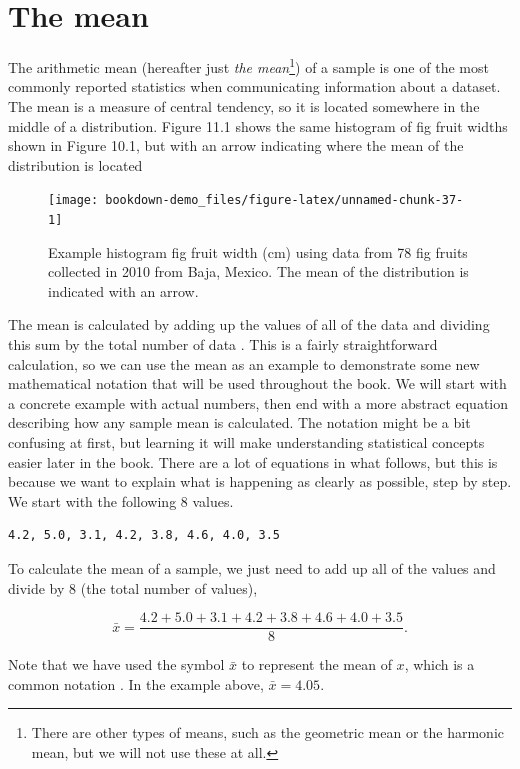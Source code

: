 \documentclass[
  openany]{scrbook}
\begin{document}
\hypertarget{the-mean}{%
\section{The mean}\label{the-mean}}

The arithmetic mean (hereafter just \emph{the mean}\footnote{There are other types of means, such as the geometric mean or the harmonic mean, but we will not use these at all.}) of a sample is one of the most commonly reported statistics when communicating information about a dataset.
The mean is a measure of central tendency, so it is located somewhere in the middle of a distribution.
Figure 11.1 shows the same histogram of fig fruit widths shown in Figure 10.1, but with an arrow indicating where the mean of the distribution is located

\begin{figure}
\texttt{[image: bookdown-demo\_files/figure-latex/unnamed-chunk-37-1]} \caption{Example histogram fig fruit width (cm) using data from 78 fig fruits collected in 2010 from Baja, Mexico. The mean of the distribution is indicated with an arrow.}\label{fig:unnamed-chunk-37}
\end{figure}

The mean is calculated by adding up the values of all of the data and dividing this sum by the total number of data \citep{Sokal1995}.
This is a fairly straightforward calculation, so we can use the mean as an example to demonstrate some new mathematical notation that will be used throughout the book.
We will start with a concrete example with actual numbers, then end with a more abstract equation describing how any sample mean is calculated.
The notation might be a bit confusing at first, but learning it will make understanding statistical concepts easier later in the book.
There are a lot of equations in what follows, but this is because we want to explain what is happening as clearly as possible, step by step.
We start with the following 8 values.

\begin{verbatim}
4.2, 5.0, 3.1, 4.2, 3.8, 4.6, 4.0, 3.5
\end{verbatim}

To calculate the mean of a sample, we just need to add up all of the values and divide by 8 (the total number of values),

\[\bar{x} = \frac{4.2 + 5.0 + 3.1 + 4.2 + 3.8 + 4.6 + 4.0 + 3.5}{8}.\]

Note that we have used the symbol \(\bar{x}\) to represent the mean of \(x\), which is a common notation \citep{Sokal1995}.
In the example above, \(\bar{x} = 4.05\).
\end{document}

